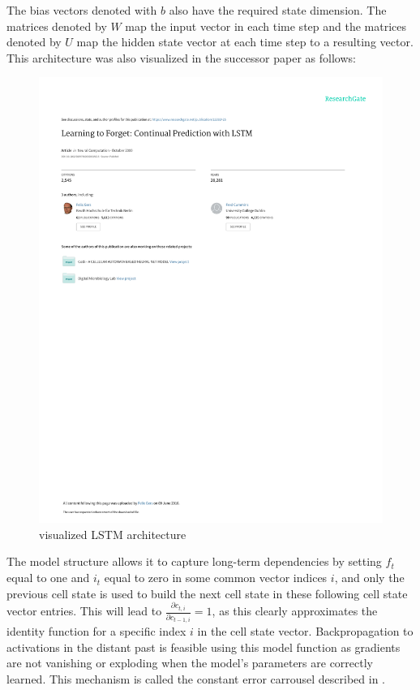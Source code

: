 \documentclass[draft,final]{vutinfth} %
\begin{document}
The bias vectors denoted with $b$ also have the required state dimension.
The matrices denoted by $W$ map the input vector in each time step and the matrices denoted by $U$ map the hidden state vector at each time step to a resulting vector.
This architecture was also visualized in the successor paper as follows:
\begin{figure}[H]
\centering{}
\includegraphics[page=6,width=0.8\linewidth,trim={175 535 200 55},clip]{literature/learning_to_forget_continual_prediction_with_lstm.pdf}
\caption{visualized LSTM architecture \cite[p. 6]{LSTM_forget}}
\label{fig:lstm_vis}
\end{figure}
The model structure allows it to capture long-term dependencies by setting $f_t$ equal to one and $i_t$ equal to zero in some common vector indices $i$, and only the previous cell state is used to build the next cell state in these following cell state vector entries.
This will lead to $\frac{\partial{c_{t,i}}}{\partial{c_{t-1,i}}} = 1$, as this clearly approximates the identity function for a specific index $i$ in the cell state vector.
Backpropagation to activations in the distant past is feasible using this model function as gradients are not vanishing or exploding when the model's parameters are correctly learned.
This mechanism is called the constant error carrousel described in \cite[p. 7]{LSTM}.
\end{document}
